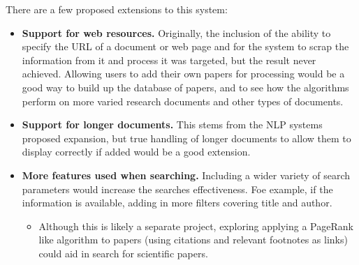 There are a few proposed extensions to this system:
\begin{itemize}
	\item \textbf{Support for web resources.} Originally, the inclusion of the ability to specify the URL of a document or web page and for the system to scrap the information from it and process it was targeted, but the result never achieved. Allowing users to add their own papers for processing would be a good way to build up the database of papers, and to see how the algorithms perform on more varied research documents and other types of documents.
	\item \textbf{Support for longer documents.} This stems from the NLP systems proposed expansion, but true handling of longer documents to allow them to display correctly if added would be a good extension.
	\item \textbf{More features used when searching.} Including a wider variety of search parameters would increase the searches effectiveness. Foe example, if the information is available, adding in more filters covering title and author.
	\begin{itemize}
		\item Although this is likely a separate project, exploring applying a PageRank like algorithm to papers (using citations and relevant footnotes as links) could aid in search for scientific papers.
	\end{itemize}
\end{itemize}
